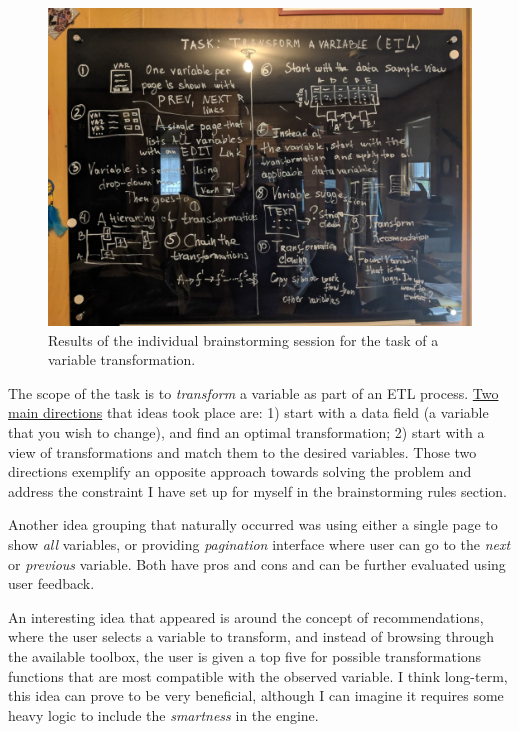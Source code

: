 \documentclass[12pt,letterpaper]{article}
\begin{document}
\begin{figure}[h]
\centering
\includegraphics[scale=.3]{figures/m3/brainstorm.jpg}
\caption{Results of the individual brainstorming session for the task of a variable transformation.}
\label{fig::1}
\end{figure}

The scope of the task is to \textit{transform} a variable as part of an ETL process. \underline{Two main directions} that ideas took place are: 1) start with a data field (a variable that you wish to change), and find an optimal transformation; 2) start with a view of transformations and match them to the desired variables. Those two directions exemplify an opposite approach towards solving the problem and address the constraint I have set up for myself in the brainstorming rules section.  

Another idea grouping that naturally occurred was using either a single page to show \textit{all} variables, or providing \textit{pagination} interface where user can go to the \textit{next} or \textit{previous} variable. Both have pros and cons and can be further evaluated using user feedback. 

An interesting idea that appeared is around the concept of recommendations, where the user selects a variable to transform, and instead of browsing through the available toolbox, the user is given a top five for possible transformations functions that are most compatible with the observed variable. I think long-term, this idea can prove to be very beneficial, although I can imagine it requires some heavy logic to include the \textit{smartness} in the engine.   
\end{document}
